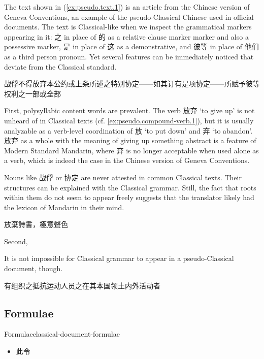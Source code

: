 \documentclass[UTF8, a4paper, oneside, scheme=plain, 12pt]{ctexrep}
\newcommand{\translate}[1]{`#1'}
\begin{document}
The text shown in (\ref{ex:pseudo.text.1}) is an article from the Chinese version of Geneva Conventions, an example of the pseudo-Classical Chinese used in official documents.
The text is Classical-like when we inspect the grammatical markers appearing in it:
之 in place of 的 as a relative clause marker marker and also a possessive marker,
是 in place of 这 as a demonstrative,
and 彼等 in place of 他们 as a third person pronoun.
Yet several features can be immediately noticed that deviate from the Classical standard.

\begin{exe}
    \ex\label{ex:pseudo.text.1} 战俘不得放弃本公约或上条所述之特别协定——如其订有是项协定——所赋予彼等权利之一部或全部
\end{exe}

First, polysyllabic content words are prevalent.
The verb 放弃 \translate{to give up} is not unheard of in Classical texts (cf. \ref{ex:pseudo.compound-verb.1}),
but it is usually analyzable as a verb-level coordination of 放 \translate{to put down} and 弃 \translate{to abandon}.
放弃 as a whole with the meaning of giving up something abstract is a feature of Modern Standard Mandarin,
where 弃 is no longer acceptable when used alone as a verb,
which is indeed the case in the Chinese version of Geneva Conventions.

Nouns like 战俘 or 协定 are never attested in common Classical texts.
Their structures can be explained with the Classical grammar.
Still, the fact that roots within them do not seem to appear freely suggests that the translator likely had the lexicon of Mandarin in their mind.

\begin{exe}
    \ex\label{ex:pseudo.compound-verb.1} 放棄詩書，極意聲色
\end{exe}

Second, 

It is not impossible for Classical grammar to appear in a pseudo-Classical document, though.

\begin{exe}
    \ex 有组织之抵抗运动人员之在其本国领土内外活动者
\end{exe}

\subsection{Formulae}

\begin{todobox}{Formulae}{classical-document-formulae}
    \begin{itemize}
        \item 此令
    \end{itemize}
\end{todobox}
\end{document}
